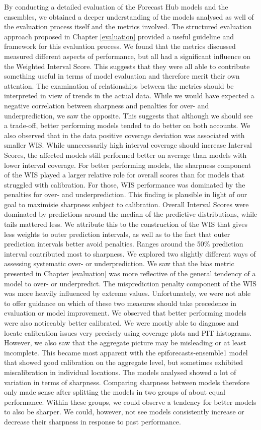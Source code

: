 \documentclass[
]{book}
\begin{document}
By conducting a detailed evaluation of the Forecast Hub models and the ensembles, we obtained a deeper understanding of the models analysed as well of the evaluation process itself and the metrics involved. The structured evaluation approach proposed in Chapter \ref{evaluation} provided a useful guideline and framework for this evaluation process. We found that the metrics discussed measured different aspects of performance, but all had a significant influence on the Weighted Interval Score. This suggests that they were all able to contribute something useful in terms of model evaluation and therefore merit their own attention. The examination of relationships between the metrics should be interpreted in view of trends in the actual data. While we would have expected a negative correlation between sharpness and penalties for over- and underprediction, we saw the opposite. This suggests that although we should see a trade-off, better performing models tended to do better on both accounts. We also observed that in the data positive coverage deviation was associated with smaller WIS. While unnecessarily high interval coverage should increase Interval Scores, the affected models still performed better on average than models with lower interval coverage.
For better performing models, the sharpness component of the WIS played a larger relative role for overall scores than for models that struggled with calibration. For those, WIS performance was dominated by the penalties for over- and underprediction. This finding is plausible in light of our goal to maximisie sharpness subject to calibration. Overall Interval Scores were dominated by predictions around the median of the predictive distributions, while tails mattered less. We attribute this to the construction of the WIS that gives less weights to outer prediction intervals, as well as to the fact that outer prediction intervals better avoid penalties. Ranges around the 50\% prediction interval contributed most to sharpness.
We explored two slightly different ways of assessing systematic over- or underprediction. We saw that the bias metric presented in Chapter \ref{evaluation} was more reflective of the general tendency of a model to over- or underpredict. The misprediction penalty component of the WIS was more heavily influenced by extreme values. Unfortunately, we were not able to offer guidance on which of these two measures should take precedence in evaluation or model improvement.
We observed that better performing models were also noticeably better calibrated. We were mostly able to diagnose and locate calibration issues very precisely using coverage plots and PIT histograms. However, we also saw that the aggregate picture may be misleading or at least incomplete. This became most apparent with the epiforecasts-ensemble1 model that showed good calibration on the aggregate level, but sometimes exhibited miscalibration in individual locations.
The models analysed showed a lot of variation in terms of sharpness. Comparing sharpness between models therefore only made sense after splitting the models in two groups of about equal performance. Within these groups, we could observe a tendency for better models to also be sharper. We could, however, not see models consistently increase or decrease their sharpness in response to past performance.
\end{document}
